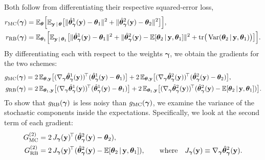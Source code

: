 Both follow from differentiating their respective squared-error loss,
%
\begin{align}
  r_{\mathrm{MC}}(\bm{\gamma})
  &= \mathbb{E}_{\bm{\theta}}\Big[ \mathbb{E}_{\mathbf{y} \,|\, \bm{\theta}}\big[
     \|\hat{\bm{\theta}}_{\bm{\gamma}}^{1}(\mathbf{y}) - \bm{\theta}_1\|^2
     + \|\hat{\bm{\theta}}_{\bm{\gamma}}^{2}(\mathbf{y}) - \bm{\theta}_2\|^2
     \big]\Big], \\
  r_{\mathrm{RB}}(\bm{\gamma})
  &= \mathbb{E}_{\bm{\theta}_1}\Big[ \mathbb{E}_{\mathbf{y} \,|\, \bm{\theta}_1}\big[
     \|\hat{\bm{\theta}}_{\bm{\gamma}}^{1}(\mathbf{y}) - \bm{\theta}_1\|^2
     + \|\hat{\bm{\theta}}_{\bm{\gamma}}^{2}(\mathbf{y})
       - \mathbb{E}[\bm{\theta}_2 \,|\, \mathbf{y}, \bm{\theta}_1]\|^2
     + \operatorname{tr}\!\big(\operatorname{Var}(\bm{\theta}_2 \,|\, \mathbf{y}, \bm{\theta}_1)\big)
     \big]\Big].
\end{align}
%
By differentiating each with respect to the weights $\bm{\gamma}$, we obtain the gradients for the two schemes:
%
\begin{align}
  g_{\mathrm{MC}}(\bm{\gamma})
  &= 2\,\mathbb{E}_{\bm{\theta}, \mathbf{y}}\big[
     (\nabla_{\bm{\gamma}} \hat{\bm{\theta}}_{\bm{\gamma}}^{1}(\mathbf{y}))^{\!\top}
     (\hat{\bm{\theta}}_{\bm{\gamma}}^{1}(\mathbf{y}) - \bm{\theta}_1) \big]
   + 2\,\mathbb{E}_{\bm{\theta}, \mathbf{y}}\big[
     (\nabla_{\bm{\gamma}} \hat{\bm{\theta}}_{\bm{\gamma}}^{2}(\mathbf{y}))^{\!\top}
     (\hat{\bm{\theta}}_{\bm{\gamma}}^{2}(\mathbf{y}) - \bm{\theta}_2) \big], \\
  g_{\mathrm{RB}}(\bm{\gamma})
  &= 2\,\mathbb{E}_{\bm{\theta}_1, \mathbf{y}}\big[
     (\nabla_{\bm{\gamma}} \hat{\bm{\theta}}_{\bm{\gamma}}^{1}(\mathbf{y}))^{\!\top}
     (\hat{\bm{\theta}}_{\bm{\gamma}}^{1}(\mathbf{y}) - \bm{\theta}_1) \big]
   + 2\,\mathbb{E}_{\bm{\theta}_1, \mathbf{y}}\big[
     (\nabla_{\bm{\gamma}} \hat{\bm{\theta}}_{\bm{\gamma}}^{2}(\mathbf{y}))^{\!\top}
     (\hat{\bm{\theta}}_{\bm{\gamma}}^{2}(\mathbf{y})
       - \mathbb{E}[\bm{\theta}_2 \,|\, \mathbf{y}, \bm{\theta}_1]) \big].
\end{align}
%
To show that $g_{\mathrm{RB}}(\bm{\gamma})$ is less noisy than $g_{\mathrm{MC}}(\bm{\gamma})$, we examine the variance of the stochastic components inside the expectations. Specifically, we look at the second term of each gradient:
%
\begin{align}
  G_{\mathrm{MC}}^{(2)} &= 2\,J_{\bm{\gamma}}(\mathbf{y})^{\!\top}(\hat{\bm{\theta}}_{\bm{\gamma}}^{2}(\mathbf{y}) - \bm{\theta}_2),  \\
  G_{\mathrm{RB}}^{(2)} &= 2\,J_{\bm{\gamma}}(\mathbf{y})^{\!\top}(\hat{\bm{\theta}}_{\bm{\gamma}}^{2}(\mathbf{y})
     - \mathbb{E}[\bm{\theta}_2 \,|\, \mathbf{y}, \bm{\theta}_1]), \qquad \text{where} \quad J_{\bm{\gamma}}(\mathbf{y}) \equiv \nabla_{\bm{\gamma}} \hat{\bm{\theta}}_{\bm{\gamma}}^{2}(\mathbf{y}).
\end{align}
